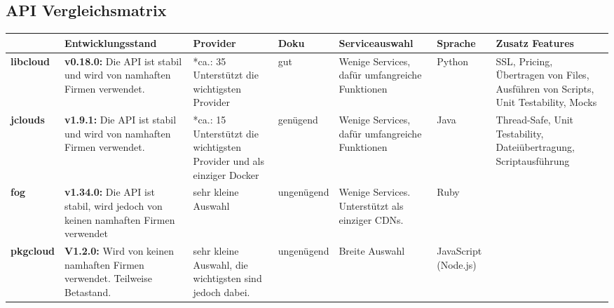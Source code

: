 
\begin{landscape}
  \subsection{API Vergleichsmatrix}
  \label{API Vergleichsmatrix}
\begin{table}[h]  
  \begin{tabularx}{\linewidth}{|l|X|X|l|X|l|X|}
    \hline
    &
    \textbf{Entwicklungsstand}
    &
    \textbf{Provider}
    &
    \textbf{Doku}
    &
    \textbf{Serviceauswahl}
    &
    \textbf{Sprache}
    &
    \textbf{Zusatz Features}
   \\
  \hline
  \textbf{libcloud} & \cellcolor{green!25} \textbf{v0.18.0:} 
  Die API ist stabil und wird von namhaften Firmen verwendet.
  & 
  \cellcolor{green!25}
  *ca.: 35 Unterstützt die wichtigsten Provider
  & 
   \cellcolor{green!25}
   gut
  & 
   \cellcolor{green!25}
  Wenige Services, dafür umfangreiche Funktionen
  & 
     \cellcolor{yellow!25}
  Python
  & 
  \cellcolor{green!25}
  SSL, Pricing, Übertragen von Files, Ausführen von Scripts, Unit Testability, Mocks
  \\
  \hline
 \textbf{jclouds}
& 
\cellcolor{green!25} 
\textbf{v1.9.1:} Die API ist stabil und wird von namhaften 
Firmen verwendet.
&	
\cellcolor{green!25}
*ca.: 15
Unterstützt die wichtigsten Provider und als einziger Docker
&
\cellcolor{yellow!25}
genügend
&
\cellcolor{green!25}
Wenige Services, dafür umfangreiche Funktionen	
&
\cellcolor{green!25}
Java	
&
\cellcolor{green!25}
Thread-Safe, Unit Testability, Dateiübertragung, Scriptausführung
 \\
 \hline
 \textbf{fog}
 &
 \cellcolor{yellow!25}	
 \textbf{v1.34.0:} 
 Die API ist stabil, wird jedoch von keinen namhaften Firmen verwendet
 &
 \cellcolor{red!50}
 sehr kleine Auswahl
 &
  \cellcolor{red!50}	
ungenügend	
&
 \cellcolor{red!50}
Wenige Services. Unterstützt als einziger CDNs.	
&
 \cellcolor{red!50}
Ruby
&
 \cellcolor{red!50}
\\
\hline
\textbf{pkgcloud}
&
 \cellcolor{yellow!25}	
\textbf{V1.2.0:} Wird von keinen namhaften Firmen verwendet. Teilweise Betastand.
&
\cellcolor{green!25}
sehr kleine Auswahl, die wichtigsten sind jedoch dabei.
&
\cellcolor{red!50}
ungenügend	
&
\cellcolor{green!25}
Breite Auswahl
&
 \cellcolor{yellow!25}	
JavaScript (Node.js)
&
 \cellcolor{yellow!25}	

\end{tabularx}
\end{table}
\end{landscape}
